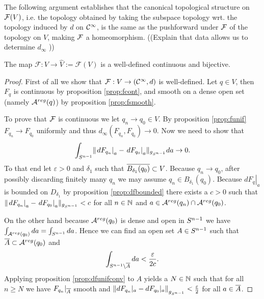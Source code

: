 The following argument establishes that the canonical topological structure on ${\mathcal{F}}(V)$, i.e. the topology obtained by taking the subspace topology wrt. the topology induced by $d$ on ${\mathcal{C}}^\infty$, is the same as the pushforward under ${\mathcal{F}}$ of the topology on $V$, making ${\mathcal{F}}$ a homeomorphism.
((Explain that data allows us to determine $d_\infty$ ))
\begin{lemma}\label{lem:Fprop}
The map $\mathcal{F}:V\to\widehat{V}:=\mathcal{F}(V)$ is a well-defined continuous and bijective.
\end{lemma}
\begin{proof}
First of all we show that $\mathcal{F}:V\to ({\mathcal{C}}^\infty,d)$ is well-defined. Let $q\in V$, then $F_q$ is continuous by proposition \ref{prop:fcont}, and smooth on a dense open set (namely ${{\mathcal{A}}^{reg}}(q)$) by proposition \ref{prop:fsmooth}.

To prove that $\mathcal{F}$ is continuous we let $q_n\to q_0 \in V$. By proposition \ref{prop:funif} $F_{q_n}\to F_{q_0}$ uniformly and thus $d_\infty(F_{q_n},F_{q_0})\to 0$. Now we need to show that 
\[
    \int_{{S^{n-1}}} \lVert \left.dF_{q_n}\right\rvert_a - \left.dF_{q_0}\right\rvert_a \rVert_{g_{S^{n-1}}}da \to 0.
\]
To that end let $\varepsilon>0$ and $\delta_1$ such that ${\overline{B_{\delta_1}(q_0)}}\subset V$. Because $q_n\to q_0$, after possibly discarding finitely many $q_n$ we may assume $q_n \in B_{\delta_1}(q_0)$. 
Because $\left.dF_{q}\right\rvert_a$ is bounded on $D_{\delta_1}$ by proposition \ref{prop:dfbounded} there exists a $c>0$ such that $\lVert \left.dF_{q_n}\right\rvert_a - \left.dF_{q_0}\right\rvert_a \rVert_{g_{S^{n-1}}}<c$ for all $n\in \mathbb{N}$ and $a\in {{\mathcal{A}}^{reg}}(q_n)\cap {{\mathcal{A}}^{reg}}(q_0)$. 

On the other hand because ${{\mathcal{A}}^{reg}}(q_0)$ is dense and open in ${S^{n-1}}$ we have $\int_{{{\mathcal{A}}^{reg}}(q_0)}da=\int_{{S^{n-1}}}da$. Hence we can find an open set $A\in {S^{n-1}}$ such that ${\overline{A}}\subset {{\mathcal{A}}^{reg}}(q_0)$ and 
\[
    \int_{{S^{n-1}} \setminus {\overline{A}}}da< \frac{\varepsilon}{2c}.
\]
Applying proposition \ref{prop:dfunifconv} to $A$ yields a $N\in \mathbb{N}$ such that for all $n\ge N$ we have $F_{q_n}\rvert_{{\overline{A}}}$ smooth and $\left\lVert dF_{q_n}\rvert_{a} - dF_{q_0}\rvert_{a}\right\rVert_{g_{{S^{n-1}}}}<\frac{\varepsilon}{2}$ for all $a\in {\overline{A}}$.


\end{proof}
